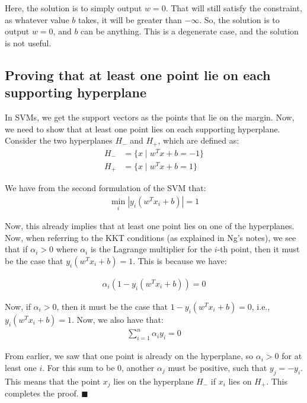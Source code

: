 \documentclass[a4paper]{article}
\begin{document}
Here, the solution is to simply output $w = 0$. That will still satisfy the constraint, as whatever value $b$ takes, it will be greater than $-\infty$. So, the solution is to output $w = 0$, and $b$ can be anything. This is a degenerate case, and the solution is not useful.


\subsection{Proving that at least one point lie on each supporting hyperplane}

In SVMs, we get the support vectors as the points that lie on the margin. Now, we need to show that at least one point lies on each supporting hyperplane. Consider the two hyperplanes $H_{-}$ and $H_{+}$, which are defined as:
\begin{align*}
    H_{-} &= \{x \mid w^T x + b = -1\}\\
    H_{+} &= \{x \mid w^T x + b = 1\}
\end{align*}

We have from the second formulation of the SVM that:
\begin{align*}
    \min_{i} | y_i(w^T x_i + b) | = 1
\end{align*}

Now, this already implies that at least one point lies on one of the hyperplanes. Now, when referring to the KKT conditions (as explained in Ng's notes), we see that if $\alpha_i > 0$ where $\alpha_i$ is the Lagrange multiplier for the $i$-th point, then it must be the case that $y_i(w^T x_i + b) = 1$. This is because we have:

\begin{align*}
    \alpha_i (1 - y_i(w^T x_i + b)) = 0
\end{align*}

Now, if $\alpha_i > 0$, then it must be the case that $1 - y_i(w^T x_i + b) = 0$, i.e., $y_i(w^T x_i + b) = 1$. Now, we also have that:
\begin{align*}
    \sum_{i=1}^n \alpha_i y_i = 0
\end{align*}

From earlier, we saw that one point is already on the hyperplane, so $\alpha_i > 0$ for at least one $i$. For this sum to be 0, another $\alpha_j$ must be positive, such that $y_j = -y_i$. This means that the point $x_j$ lies on the hyperplane $H_{-}$ if $x_i$ lies on $H_{+}$. This completes the proof. $\blacksquare$\\
\end{document}
